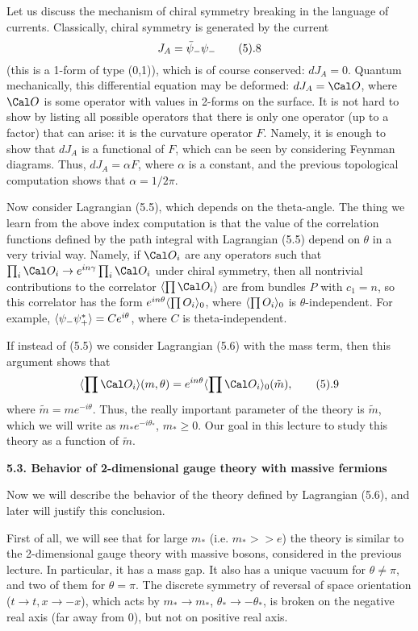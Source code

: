 Let us discuss the mechanism of chiral symmetry breaking in the language 
of currents. Classically, chiral symmetry is generated by the current
$$
J_A=\bar\psi_-\psi_-\tag 5.8
$$
(this is a 1-form of type (0,1)),
which is of course conserved: $dJ_A=0$. 
Quantum mechanically, this differential equation 
may be deformed: $dJ_A=\O$, where $\O$ is some operator
with values in 2-forms on the surface. 
It is not hard to show by listing all possible operators
that there is only one operator 
(up to a factor) that can arise: it is the curvature operator $F$. 
Namely, it is enough to show that $dJ_A$ is a functional of $F$, which can 
be seen by considering Feynman diagrams.  
Thus, $dJ_A=\alpha F$, where $\alpha$ is a constant, and the previous 
topological computation shows that $\alpha=1/2\pi$. 

Now consider Lagrangian (5.5), which depends on the theta-angle. 
The thing we learn from the above index computation is that the value of
the correlation functions 
defined by the path integral with Lagrangian (5.5) depend on $\theta$
in a very trivial way. 
Namely, if $\O_i$ are any operators such that $\prod_i \O_i\to e^{in\gamma}
\prod_i \O_i$ under chiral symmetry, then all nontrivial contributions 
to the correlator $\<\prod \O_i\>$ are from bundles $P$ with $c_1=n$, so 
this correlator has the form $e^{in\theta}\langle\prod O_i\rangle_0$, where 
$\langle\prod O_i\rangle_0$ is $\theta$-independent. For example, 
$\langle\psi_-\psi_+^*\rangle=Ce^{i\theta}$, where $C$ is theta-independent. 

If instead of (5.5) we consider Lagrangian (5.6) with the mass term, 
then this argument shows that 
$$
\<\prod \O_i\>(m,\theta)=
e^{in\theta}\<\prod \O_i\>_0(\tilde m),\tag 5.9
$$
where $\tilde m=me^{-i\theta}$. Thus, the really important parameter 
of the theory is $\tilde m$, which we will write as $m_*e^{-i\theta_*}$,
$m_*\ge 0$. Our goal in this lecture to study this theory 
as a function of $\tilde m$. 

{\bf 5.3. Behavior of 2-dimensional gauge theory with massive fermions}

Now we will describe the behavior of the theory defined by 
Lagrangian (5.6), and later will justify this conclusion. 

First of all,  we will see that for large $m_*$ (i.e. $m_*>>e$) 
the theory is similar to the 2-dimensional gauge theory with 
massive bosons, considered in the previous lecture. In particular, it has
a mass gap. It also has a unique vacuum for $\theta\ne \pi$, and 
two of them for $\theta=\pi$. The 
discrete symmetry of reversal of space
orientation ($t\to t,x\to -x$), which acts by $m_*\to m_*$, 
$\theta_*\to -\theta_*$, is broken on the negative real axis
(far away from $0$), but not on positive real axis.   

